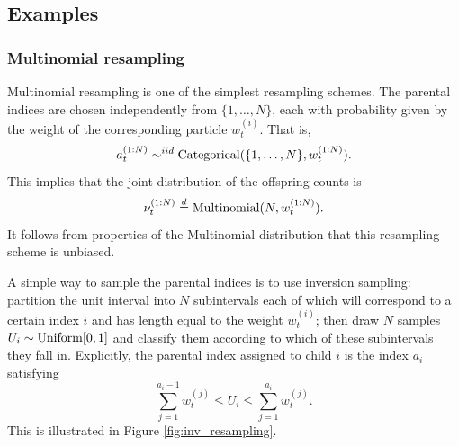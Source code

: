 \subsection{Examples}
\label{sec:examples_resamplingschemes}

 
\subsubsection{Multinomial resampling}
Multinomial resampling \parencite{rubin1987,gordon1993,efron1994} is one of the simplest resampling schemes.
The parental indices are chosen independently from $\{1, \dots, N\}$, each with probability given by the weight of the corresponding particle $w_t^{(i)}$. 
That is, 
\begin{equation*}
a_t^{(1:N)} \sim^{iid} \operatorname{Categorical}( \{1,\dots, N\}, w_t^{(1:N)} ) .
\end{equation*}
This implies that the joint distribution of the offspring counts is 
\begin{equation*}
\nu_t^{(1:N)} \overset{d}{=} \operatorname{Multinomial}(N, w_t^{(1:N)} ) .
\end{equation*}
It follows from properties of the Multinomial distribution that this resampling scheme is unbiased.

A simple way to sample the parental indices is to use inversion sampling: partition the unit interval into $N$ subintervals each of which will correspond to a certain index $i$ and has length equal to the weight $w_t^{(i)}$; then draw $N$ samples $U_i \sim \operatorname{Uniform}[0,1]$ and classify them according to which of these subintervals they fall in.
Explicitly, the parental index assigned to child $i$ is the index $a_i$ satisfying
\begin{equation}\label{eq:syst_strat_resampling}
\sum_{j=1}^{a_i -1} w_t^{(j)} \leq U_i \leq \sum_{j=1}^{a_i} w_t^{(j)} .
\end{equation}
This is illustrated in Figure \ref{fig:inv_resampling}. 

